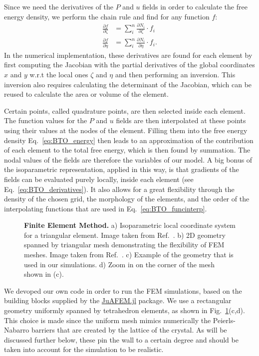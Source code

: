 Since we need the derivatives of the $P$ and $u$ fields in order to calculate the free energy density, we perform the chain rule and find for any function $f$:
\begin{align}
	\label{eq:BTO_derivatives}
	\frac{\partial f}{\partial \zeta} &= \sum_i^n \frac{\partial N_i}{\partial \zeta} \cdot f_i \\
	\frac{\partial f}{\partial \eta}  &= \sum_i^n \frac{\partial N_i}{\partial \eta} \cdot f_i.
\end{align}
In the numerical implementation, these derivatives are found for each element by first computing the Jacobian with the partial derivatives of the global coordinates $x$ and $y$ w.r.t the local ones $\zeta$ and $\eta$ and then performing an inversion.
This inversion also requires calculating the determinant of the Jacobian, which can be reused to calculate the area or volume of the element.

Certain points, called quadrature points, are then selected inside each element.
The function values for the $P$ and $u$ fields are then interpolated at these points using their values at the nodes of the element.
Filling them into the free energy density Eq.~\eqref{eq:BTO_energy} then leads to an approximation of the contribution of each element to the total free energy, which is then found by summation. 
The nodal values of the fields are therefore the variables of our model. 
A big bonus of the isoparametric representation, applied in this way, is that gradients of the fields can be evaluated purely locally, inside each element (see Eq.~\eqref{eq:BTO_derivatives}).
It also allows for a great flexibility through the density of the chosen grid, the morphology of the elements, and the order of the interpolating functions that are used in Eq.~\eqref{eq:BTO_funcinterp}.

\begin{figure}[h!]
	\caption{\label{fig:BTO_fem}{\bf Finite Element Method.} a) Isoparametric local coordinate system for a triangular element. Image taken from Ref.~\cite{Biner}. b) 2D geometry spanned by triangular mesh demonstrating the flexibility of FEM meshes. Image taken from Ref.~\cite{2Dmesh}. c) Example of the geometry that is used in our simulations. d) Zoom in on the corner of the mesh shown in (c).}
\end{figure}

We devoped our own code in order to run the FEM simulations, based on the building blocks supplied by the \href{https://github.com/KristofferC/JuAFEM.jl}{JuAFEM.jl} package.
We use a rectangular geometry uniformly spanned by tetrahedron elements, as shown in Fig.~\ref{fig:BTO_fem}(c,d).
This choice is made since the uniform mesh mimics numerically the Peierls-Nabarro barriers that are created by the lattice of the crystal.
As will be discussed further below, these pin the wall to a certain degree and should be taken into account for the simulation to be realistic.

